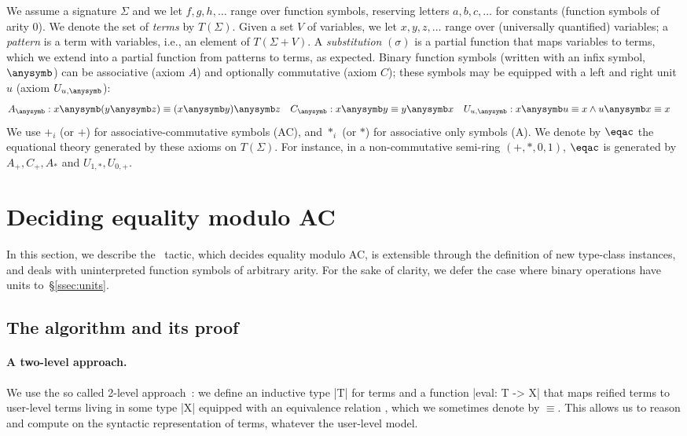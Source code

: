 \documentclass{llncs}
\begin{document}
We assume a signature $\Sigma$ and we let $f,g,h,\dots$ range over
function symbols, reserving letters $a,b,c,\dots$ for constants
(function symbols of arity $0$). We denote the set of \emph{terms} by
$T(\Sigma)$.
Given a set $V$ of variables, we let $x,y,z,\dots$ range over
(universally quantified) variables; a \emph{pattern} is a term with
variables, i.e., an element of $T(\Sigma + V)$.
A \emph{substitution} $(\sigma)$ is a partial function that maps
variables to terms, which we extend into a partial function from
patterns to terms, as expected.
Binary function symbols (written with an infix symbol, $\anysymb$) can
be associative (axiom $A$) and optionally commutative (axiom $C$);
these symbols may be equipped with a left and right unit $u$ (axiom
$U_{u,\anysymb}$):
\begin{align*}
A_\anysymb &: x \anysymb ( y \anysymb z ) \equiv (x\anysymb y)\anysymb z &
C_\anysymb &: x \anysymb y \equiv y \anysymb x &
U_{u,\anysymb} &: x \anysymb u \equiv  x  \wedge u \anysymb x  \equiv x \end{align*}
We use $+_i$ (or $+$) for associative-commutative symbols (AC), and
$*_i$ (or $*$) for associative only symbols (A).
We denote by $\eqac$ the equational theory generated by these axioms
on $T(\Sigma)$. For instance, in a non-commutative semi-ring
$(+,*,0,1)$, $\eqac$ is generated by $A_{+},C_{+},A_{*}$ and
$U_{1,*},U_{0,+}$.

\section{Deciding equality modulo AC}
\label{sec:decision}

In this section, we describe the \tac\ tactic, which decides equality
modulo AC, is extensible through the definition of new type-class
instances, and deals with uninterpreted function symbols of arbitrary
arity.
For the sake of clarity, we defer the case where binary operations have
units to~\S\ref{ssec:units}.

\subsection{The algorithm and its proof}
\label{ssec:coqalgo}

\paragraph{A two-level approach.}  

We use the so called 2-level approach~\cite{barthe-barendregt-95}: we
define an inductive type \coqinline|T| for terms and a function
\coqinline|eval: T -> X| that maps reified terms to user-level terms
living in some type \coqinline|X| equipped with an equivalence
relation , which we sometimes denote by $\equiv$. This allows
us to reason and compute on the syntactic representation of terms,
whatever the user-level model.
\end{document}
